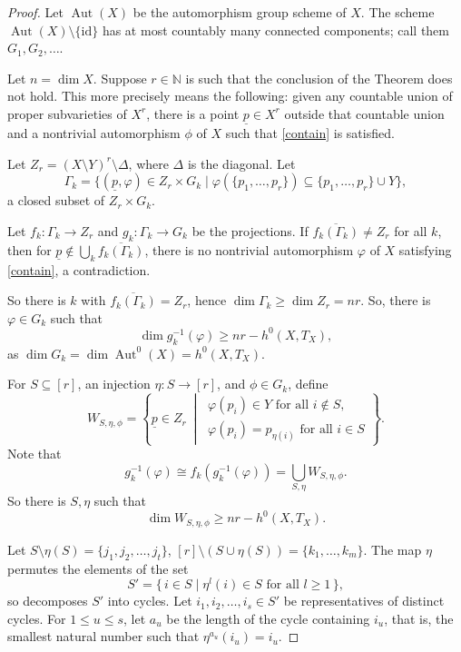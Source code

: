 \documentclass[11pt,letterpaper]{amsart}
\begin{document}
\begin{proof}
Let $\operatorname{Aut}(X)$ be the automorphism group scheme of $X$. The scheme
$\operatorname{Aut}(X)\setminus\{\mathrm{id}\}$ has at most countably many connected
components; call them $G_1,G_2,\ldots$.

Let $n=\dim X$. Suppose $r\in\mathbb{N}$ is such that the conclusion of the Theorem does not hold. This more precisely means the following: given any countable union of proper subvarieties of $X^r$, there is a point $\underline{p}\in X^r$ outside that countable union and a nontrivial automorphism $\phi$ of $X$ such that \eqref{contain} is satisfied.

Let $Z_r=(X\setminus Y)^r\setminus\Delta$, where $\Delta$ is the diagonal. Let
\[
\Gamma_k=\{(\underline{p},\varphi)\in Z_r\times G_k\mid
\varphi(\{p_1,\ldots,p_r\})\subseteq
\{p_1,\ldots,p_r\}\cup Y\},
\]
a closed subset of $Z_r\times G_k$.

Let $f_k:\Gamma_k\to Z_r$ and $g_k:\Gamma_k\to G_k$ be the projections. If $\overline{f_k(\Gamma_k)}\neq Z_r$ for all $k$, then for
$\underline{p}\notin\bigcup_k\overline{f_k(\Gamma_k)}$, there is no nontrivial automorphism $\varphi$ of $X$ satisfying \eqref{contain}, a contradiction.

So there is $k$ with $\overline{f_k(\Gamma_k)}=Z_r$, hence
$\dim\Gamma_k\ge \dim Z_r=nr$. So, there is $\varphi\in G_k$ such that
\begin{equation}\label{dim}
\dim g_k^{-1}(\varphi)\ge nr-h^0(X,T_X),
\end{equation}
as $\dim G_k=\dim\operatorname{Aut}^0(X)=h^0(X,T_X)$.

For $S\subseteq [r]$, an injection $\eta:S\to [r]$, and $\phi\in G_k$, define
\[
W_{S,\eta,\phi}=
\left\{
\underline{p}\in Z_r\ \middle|\
\begin{array}{l}
\varphi(p_i)\in Y \text{ for all } i\notin S,\\
\varphi(p_i)=p_{\eta(i)} \text{ for all } i\in S
\end{array}
\right\}.
\] Note that
\[
g_k^{-1}(\varphi)\cong f_k(g_k^{-1}(\varphi))=\bigcup_{S,\eta}W_{S,\eta,\phi}.
\]
So there is $S,\eta$ such that
\[
\dim W_{S,\eta,\phi}\ge nr-h^0(X,T_X).
\]

Let $S\setminus\eta(S)=\{j_1,j_2,\ldots,j_t\}$, $[r]\setminus(S\cup\eta(S))=\{k_1,\ldots,k_m\}$. The map $\eta$ permutes the elements of the set
\[
S'=\{\,i\in S\mid \eta^l(i)\in S\text{ for all }l\ge1\,\},
\]
so decomposes $S'$ into cycles. Let $i_1,i_2,\ldots,i_s\in S'$ be representatives of distinct cycles. For $1\le u\le s$, let $a_u$ be the length of the cycle containing $i_u$, that is, the smallest natural number such that $\eta^{a_u}(i_u)=i_u$.


\end{proof}
\end{document}
